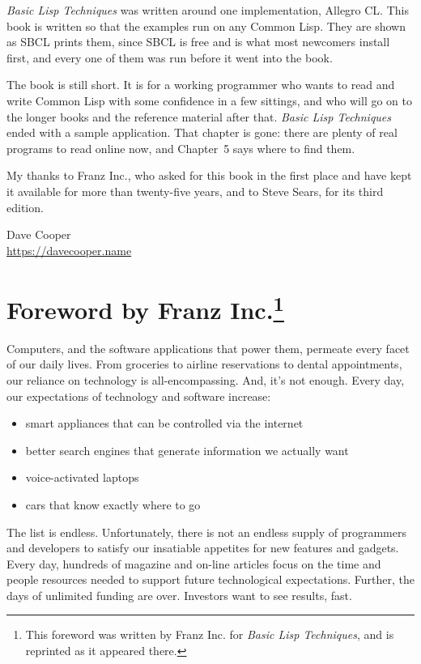 \documentclass[11pt]{book}
\begin{document}
\emph{Basic Lisp Techniques} was written around one implementation,
Allegro CL. This book is written so that the examples run on any Common Lisp. They
are shown as SBCL prints them, since SBCL is free and is what most
newcomers install first, and every one of them was run before it went
into the book.

The book is still short. It is for a working programmer who wants to
read and write Common Lisp with some confidence in a few sittings, and
who will go on to the longer books and the reference material after
that. \emph{Basic Lisp Techniques} ended with a sample application.
That chapter is gone: there are plenty of real programs to read online now,
and Chapter~5 says where to find them.

My thanks to Franz Inc., who asked for this book in the first place
and have kept it available for more than twenty-five years, and to
Steve Sears, for its third edition.

\begin{flushright}
Dave Cooper\\
\url{https://davecooper.name}
\end{flushright}

\chapter*{Foreword by Franz Inc.\footnote{This foreword was written by Franz Inc. for \emph{Basic Lisp Techniques}, and is reprinted as it appeared there.}}

Computers, and the software applications that power them, permeate every facet of our
daily lives. From groceries to airline reservations to dental appointments, our reliance
on technology is all-encompassing. And, it's not enough. Every day, our expectations of
technology and software increase:

\begin{itemize}
\item smart appliances that can be controlled via the internet
\item better search engines that generate information we actually want
\item voice-activated laptops
\item cars that know exactly where to go
\end{itemize}

The list is endless. Unfortunately, there is not an endless supply of programmers and
developers to satisfy our insatiable appetites for new features and gadgets. Every day,
hundreds of magazine and on-line articles focus on the time and people resources needed to
support future technological expectations. Further, the days of unlimited funding are over.
Investors want to see results, fast.
\end{document}
